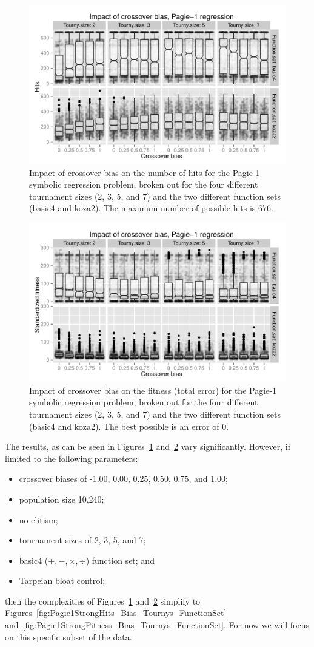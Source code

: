 \documentclass{sig-alternate}
\begin{document}
\begin{figure}
\centering
\includegraphics[width=0.45 \textwidth]{Plots/Pagie_1_Hits_vs_Bias_Tournys_FunctionSet.pdf}
\caption{Impact of crossover bias on the number of hits for the Pagie-1 symbolic regression problem, broken out for the
four different tournament sizes (2, 3, 5, and 7) and the two different function sets (basic4 and koza2). The maximum
number of possible hits is 676.}
\label{fig:Pagie1Hits_Bias_Tournys_FunctionSet}
\end{figure}

\begin{figure}
\centering
\includegraphics[width=0.45 \textwidth]{Plots/Pagie_1_Fitness_vs_Bias_Tournys_FunctionSet.pdf}
\caption{Impact of crossover bias on the fitness (total error) for the Pagie-1 symbolic regression problem, broken out 
for the four different tournament sizes (2, 3, 5, and 7) and the two different function sets (basic4 and koza2). The
best possible is an error of 0.}
\label{fig:Pagie1Fitness_Bias_Tournys_FunctionSet}
\end{figure}

The results, as can be seen in Figures~\ref{fig:Pagie1Hits_Bias_Tournys_FunctionSet}
and~\ref{fig:Pagie1Fitness_Bias_Tournys_FunctionSet} vary significantly. However, if limited to the following
parameters:
\begin{itemize}
    \item crossover biases of -1.00, 0.00, 0.25, 0.50, 0.75, and 1.00;
    \item population size 10,240;
    \item no elitism;
    \item tournament sizes of 2, 3, 5, and 7;
	\item basic4 ($+, -, \times, \div$) function set; and
	\item Tarpeian bloat control;
\end{itemize}
then the complexities of Figures~\ref{fig:Pagie1Hits_Bias_Tournys_FunctionSet}
and~\ref{fig:Pagie1Fitness_Bias_Tournys_FunctionSet} simplify to
Figures~\ref{fig:Pagie1StrongHits_Bias_Tournys_FunctionSet} and~\ref{fig:Pagie1StrongFitness_Bias_Tournys_FunctionSet}.
For now we will focus on this specific subset of the data.
\end{document}
